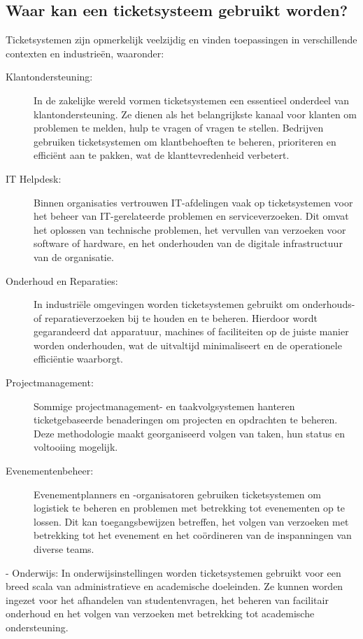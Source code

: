 \subsection{Waar kan een ticketsysteem gebruikt worden?}
 Ticketsystemen zijn opmerkelijk veelzijdig en vinden toepassingen in verschillende contexten en industrieën, waaronder:
 \begin{description}
   \item[Klantondersteuning:] In de zakelijke wereld vormen ticketsystemen een essentieel onderdeel van klantondersteuning. Ze dienen als het belangrijkste kanaal voor klanten om problemen te melden, hulp te vragen of vragen te stellen. Bedrijven gebruiken ticketsystemen om klantbehoeften te beheren, prioriteren en efficiënt aan te pakken, wat de klanttevredenheid verbetert.
   \item[IT Helpdesk:] Binnen organisaties vertrouwen IT-afdelingen vaak op ticketsystemen voor het beheer van IT-gerelateerde problemen en serviceverzoeken. Dit omvat het oplossen van technische problemen, het vervullen van verzoeken voor software of hardware, en het onderhouden van de digitale infrastructuur van de organisatie.
   \item[Onderhoud en Reparaties:] In industriële omgevingen worden ticketsystemen gebruikt om onderhouds- of reparatieverzoeken bij te houden en te beheren. Hierdoor wordt gegarandeerd dat apparatuur, machines of faciliteiten op de juiste manier worden onderhouden, wat de uitvaltijd minimaliseert en de operationele efficiëntie waarborgt.
   \item[Projectmanagement:] Sommige projectmanagement- en taakvolgsystemen hanteren ticketgebaseerde benaderingen om projecten en opdrachten te beheren. Deze methodologie maakt georganiseerd volgen van taken, hun status en voltooiing mogelijk.
   \item[Evenementenbeheer:] Evenementplanners en -organisatoren gebruiken ticketsystemen om logistiek te beheren en problemen met betrekking tot evenementen op te lossen. Dit kan toegangsbewijzen betreffen, het volgen van verzoeken met betrekking tot het evenement en het coördineren van de inspanningen van diverse teams.
  \end{description}
- Onderwijs: In onderwijsinstellingen worden ticketsystemen gebruikt voor een breed scala van administratieve en academische doeleinden. Ze kunnen worden ingezet voor het afhandelen van studentenvragen, het beheren van facilitair onderhoud en het volgen van verzoeken met betrekking tot academische ondersteuning.
